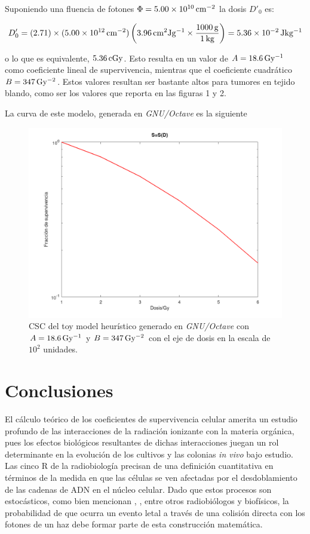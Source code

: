 \documentclass[12pt,letterpaper, oneside]{book}
\begin{document}
	Suponiendo una fluencia de fotones $\Phi=\unit[5.00\times 10^{10}]{cm^{-2}}$ la dosis $D'_0$ es:
	
	$$D'_0=(2.71)\times (\unit[5.00\times 10^{12}]{cm^{-2}})\left(\unit[3.96]{cm^2 Jg^{-1}}\times\frac{\unit[1000]{g}}{\unit[1]{kg}}\right)=\unit[5.36\times10^{-2}]{Jkg^{-1}}$$
	
	\noindent o lo que es equivalente, $\unit[5.36]{cGy}$. Esto resulta en un valor de $\unit[A=18.6]{Gy^{-1}}$ como coeficiente lineal de supervivencia, mientras que el coeficiente cuadrático $B=\unit[347]{Gy^{-2}}$. Estos valores resultan ser bastante altos para tumores en tejido blando, como ser los valores que \cite{Leeuwen.2018} reporta en las figuras 1 y 2. 
	
	La curva de este modelo, generada en \textit{GNU/Octave} es la siguiente
	
	\begin{figure}[h!]
		\centering
		\includegraphics[scale=0.30]{figuras/Csc_toymodel.png}
		\caption{CSC del toy model heurístico generado en \textit{GNU/Octave} con $A=\unit[18.6]{Gy^{-1}}$ y $B=\unit[347]{Gy^{-2}}$ con el eje de dosis en la escala de $10^2$ unidades.}\label{figura_curva_mia}
	\end{figure}  
	
	\chapter{Conclusiones}
	
	El cálculo teórico de los coeficientes de supervivencia celular amerita un estudio profundo de las interacciones de la radiación ionizante con la materia orgánica, pues los efectos biológicos resultantes de dichas interacciones juegan un rol determinante en la evolución de los cultivos y las colonias \textit{in vivo} bajo estudio. Las cinco R de la radiobiología precisan de una definición cuantitativa en términos de la medida en que las células se ven afectadas por el desdoblamiento de las cadenas de ADN en el núcleo celular. Dado que estos procesos son estocásticos, como bien mencionan \cite{Mayles.2007}, \cite{McMahon.2018}, \cite{Hall.2000} entre otros radiobiólogos y biofísicos, la probabilidad de que ocurra un evento letal a través de una colisión directa con los fotones de un haz debe formar parte de esta construcción matemática. 
	
\end{document}
